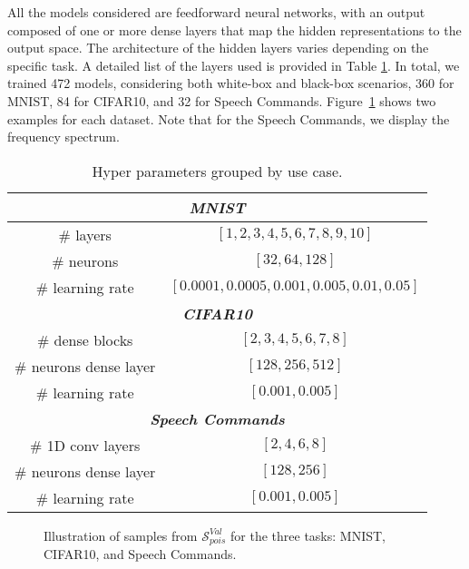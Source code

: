 All the models considered are feedforward neural networks, with an output composed of one or more dense layers that map the hidden representations to the output space. The architecture of the hidden layers varies depending on the specific task. A detailed list of the layers used is provided in Table \ref{tab.hp}.
In total, we trained 472 models, considering both white-box and black-box scenarios, 360 for MNIST, 84 for CIFAR10, and 32 for Speech Commands. 
Figure~\ref{fig:clean_samples} shows two examples for each dataset. Note that for the Speech Commands, we display the frequency spectrum. 

\begin{table}[!htpb]
\centering
\footnotesize
\caption{Hyper parameters grouped by use case. }
\begin{tabular}{cc} \toprule
\multicolumn{2}{c}{\textit{\textbf{MNIST}}} \\ \midrule
    $\#$ layers &     $[1, 2, 3, 4, 5, 6, 7, 8, 9, 10]$        \\
    $\#$ neurons &     $[32, 64, 128]$        \\
    $\#$ learning rate &     $[0.0001, 0.0005, 0.001, 0.005, 0.01, 0.05]$       \\ \midrule
    \multicolumn{2}{c}{\textit{\textbf{CIFAR10}}} \\ \midrule
    $\#$ dense blocks &     $[2, 3, 4, 5, 6, 7, 8]$        \\
    $\#$ neurons dense layer&     $[128, 256, 512]$        \\
    $\#$ learning rate &     $[0.001, 0.005]$       \\ \midrule
    \multicolumn{2}{c}{\textit{\textbf{Speech Commands}}} \\ \midrule
    $\#$ 1D conv layers &     $[2, 4, 6, 8]$        \\
    $\#$ neurons dense layer &     $[128, 256]$        \\
    $\#$ learning rate &     $[0.001, 0.005]$       \\ \bottomrule
\end{tabular}
\label{tab.hp}
\end{table}

\begin{figure}[!htpb]
    \centering
    
    \caption{Illustration of samples from $\mathcal{S}^{Val}_{pois}$ for the three tasks: MNIST, CIFAR10, and Speech Commands.}
    \label{fig:clean_samples}
\end{figure}
 

